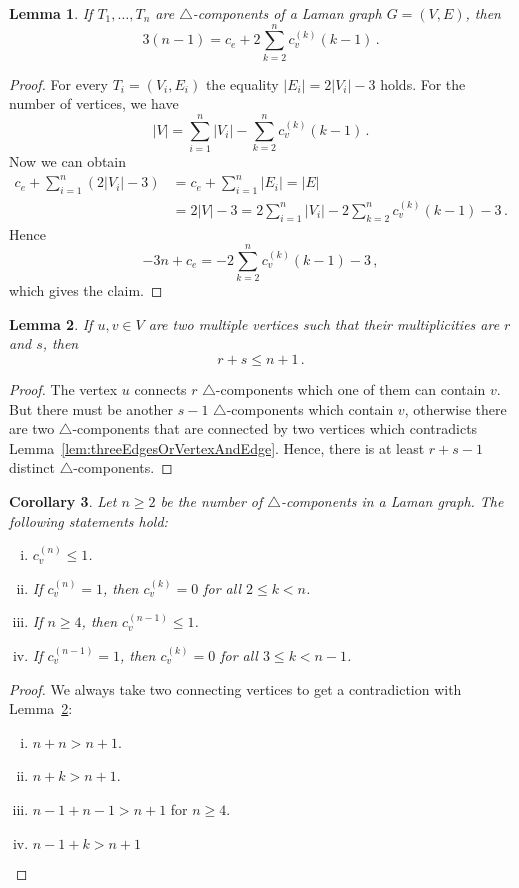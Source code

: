 \documentclass[a4paper, 11pt]{article}
\newcommand{\trcomps}{$\triangle$-components}
\newcommand{\cv}[1]{c_v^{(#1)}}
\newtheorem{lem}{Lemma}[section]
\newtheorem{cor}[lem]{Corollary}
\theoremstyle{definition}
\begin{document}
\begin{lem}
\label{lem:numCvCe}
If  $T_1, \dots, T_n$ are \trcomps{} of a Laman graph $G=(V,E)$, then
$$
3(n-1)=c_e + 2\sum_{k=2}^n \cv{k}(k-1)\,.
$$
\end{lem}
\begin{proof}
For every $T_i=(V_i,E_i)$ the equality $|E_i|=2|V_i|-3$ holds. For the number of vertices, we have
$$
|V|=\sum_{i=1}^n |V_i| - \sum_{k=2}^n \cv{k}(k-1)\,.
$$
Now we can obtain
\begin{align*}
c_e+\sum_{i=1}^n (2|V_i|-3)&=c_e + \sum_{i=1}^n |E_i|= |E|\\
	&=2|V|-3 = 2\sum_{i=1}^n |V_i| - 2\sum_{k=2}^n \cv{k}(k-1) -3\,.
\end{align*}
Hence
$$-3n + c_e= - 2\sum_{k=2}^n \cv{k}(k-1) -3\,,
$$
which gives the claim.
\end{proof}

\begin{lem}
\label{lem:twoConnectingVertices}
If $u,v\in V$ are two multiple vertices such that their multiplicities are $r$ and $s$, then
$$
r+s\leq n+1\,.
$$
\end{lem}
\begin{proof}
The vertex $u$ connects $r$ \trcomps{} which one of them can contain $v$. But there must be another $s-1$ \trcomps{} which contain $v$, otherwise there are two \trcomps{} that are connected by two vertices which contradicts Lemma~\ref{lem:threeEdgesOrVertexAndEdge}. Hence, there is at least $r+s-1$ distinct \trcomps{}.
\end{proof}

\begin{cor}
\label{cor:validCv}
Let $n\geq 2$ be the number of \trcomps{} in a Laman graph. The following statements hold:
\begin{enumerate}[i)]
	\item $\cv{n} \leq 1$.
	\item If $\cv{n} = 1$, then $\cv{k}=0$ for all $2\leq k<n$.
	\item If $n\geq 4$, then $\cv{n-1} \leq 1$.
	\item If $\cv{n-1} = 1$, then $\cv{k}=0$ for all $3\leq k<n-1$.
\end{enumerate}
\end{cor}
\begin{proof}
We always take two connecting vertices to get a contradiction with Lemma~\ref{lem:twoConnectingVertices}:
\begin{enumerate}[i)]
	\item $n+n >n +1$.
	\item $n +k>n+1$.
	\item $n-1+n-1>n+1$ for $n\geq 4$.
	\item $n-1+k>n+1$
\end{enumerate}
\end{proof}
\end{document}
